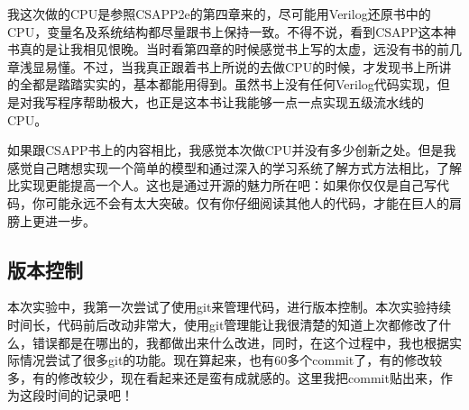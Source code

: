 我这次做的CPU是参照CSAPP2e的第四章来的，尽可能用Verilog还原书中的CPU，变量名及系统结构都尽量跟书上保持一致。不得不说，看到CSAPP这本神书真的是让我相见恨晚。当时看第四章的时候感觉书上写的太虚，远没有书的前几章浅显易懂。不过，当我真正跟着书上所说的去做CPU的时候，才发现书上所讲的全都是踏踏实实的，基本都能用得到。虽然书上没有任何Verilog代码实现，但是对我写程序帮助极大，也正是这本书让我能够一点一点实现五级流水线的CPU。

如果跟CSAPP书上的内容相比，我感觉本次做CPU并没有多少创新之处。但是我感觉自己瞎想实现一个简单的模型和通过深入的学习系统了解方式方法相比，了解比实现更能提高一个人。这也是通过开源的魅力所在吧：如果你仅仅是自己写代码，你可能永远不会有太大突破。仅有你仔细阅读其他人的代码，才能在巨人的肩膀上更进一步。

\subsection{版本控制}\label{ux7248ux672cux63a7ux5236}

本次实验中，我第一次尝试了使用git来管理代码，进行版本控制。本次实验持续时间长，代码前后改动非常大，使用git管理能让我很清楚的知道上次都修改了什么，错误都是在哪出的，我都做出来什么改进，同时，在这个过程中，我也根据实际情况尝试了很多git的功能。现在算起来，也有60多个commit了，有的修改较多，有的修改较少，现在看起来还是蛮有成就感的。这里我把commit贴出来，作为这段时间的记录吧！

